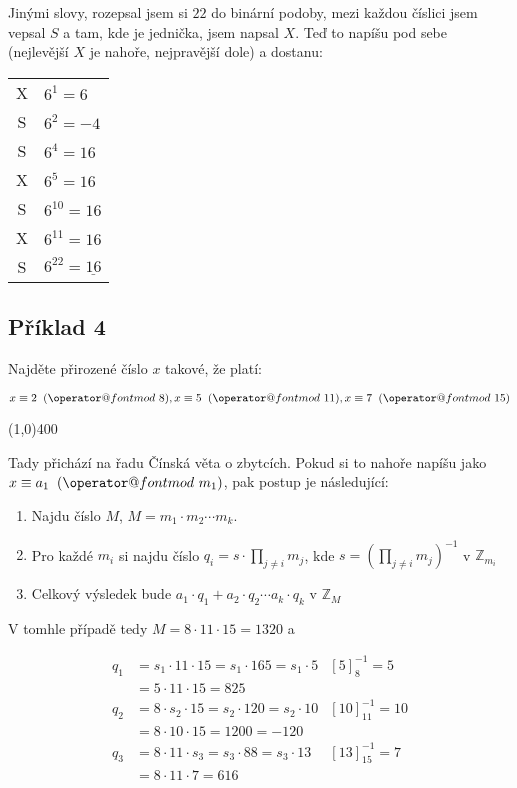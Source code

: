 \documentclass{article}
\makeatletter
\def\imod#1{\allowbreak\mkern10mu({\operator@font mod}\,\,#1)}
\makeatother
\begin{document}
Jinými slovy, rozepsal jsem si $22$ do binární podoby, mezi každou číslici jsem vepsal $S$ a tam, kde je jednička, jsem napsal $X$. Teď to napíšu pod sebe (nejlevější $X$ je nahoře, nejpravější dole) a dostanu: 
\begin{center}
	\begin{tabular}{c|l}
		X & $6^1 = 6$ \\
		S & $6^2 = -4$ \\
		S & $6^4 = 16$ \\
		X & $6^5 = 16$ \\
		S & $6^{10} = 16$ \\
		X & $6^{11} = 16$ \\
		S & $6^{22} = \underline{16}$
	\end{tabular}
\end{center}


\subsection{\label{priklad1-4}Příklad 4}
Najděte přirozené číslo $x$ takové, že platí:

$$x\equiv 2\imod{8}, x\equiv 5\imod{11}, x\equiv 7\imod{15}$$

\line(1,0){400}

Tady přichází na řadu Čínská věta o zbytcích. Pokud si to nahoře napíšu jako $x\equiv a_1\imod{m_1}$, pak postup je následující:
\begin{enumerate}
	\item Najdu číslo $M$, $M = m_1\cdot m_2 \cdots m_k$.
	\item Pro každé $m_i$ si najdu číslo $\displaystyle q_i = s\cdot \prod_{j \neq i}m_j$, kde  $s = \left( \displaystyle \prod_{j \neq i}m_j \right)^{-1}$ v $\mathbb{Z}_{m_i}$
	\item Celkový výsledek bude $a_1 \cdot q_1 + a_2 \cdot q_2 \cdots a_k \cdot q_k$ v $\mathbb{Z}_M$ 
\end{enumerate}

V tomhle případě tedy $M = 8\cdot 11\cdot 15 = 1320$ a 

\begin{align*}
q_1 & = s_1\cdot 11 \cdot 15 = s_1 \cdot 165 = s_1 \cdot 5		& \left[ 5\right]^{-1}_8 = 5\\
		& = 5 \cdot 11 \cdot 15 = 825 & \\
q_2 & = 8 \cdot s_2 \cdot 15 = s_2 \cdot 120 = s_2 \cdot 10		& \left[ 10\right]^{-1}_{11} = 10\\
		& = 8 \cdot 10 \cdot 15 = 1200 = -120 & \\
q_3 & = 8 \cdot 11 \cdot s_3 = s_3 \cdot 88 = s_3 \cdot 13		& \left[ 13\right]^{-1}_{15} = 7 \\
		& = 8 \cdot 11 \cdot 7 = 616 & \\
\end{align*}
\end{document}
